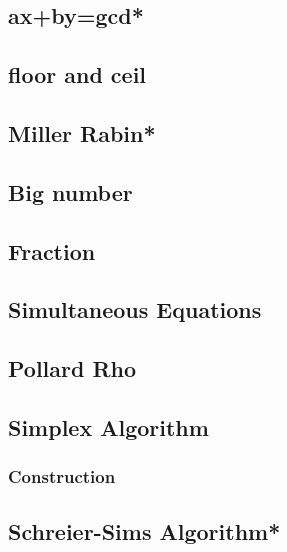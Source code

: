 \subsection{ax+by=gcd*} %

\subsection{floor and ceil}

% 
\subsection{Miller Rabin*} %

\subsection{Big number}

\subsection{Fraction}

\subsection{Simultaneous Equations}

\subsection{Pollard Rho}

\subsection{Simplex Algorithm}

\subsubsection{Construction}

\subsection{Schreier-Sims Algorithm*} %


